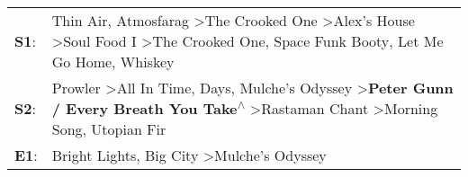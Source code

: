 \begin{supertabular}{p{0.03\textwidth}p{0.92\textwidth}}
 \textbf{S1}:  &                     Thin Air\textsuperscript{}, \enspace Atmosfarag\textsuperscript{} \textgreater \enspace The Crooked One\textsuperscript{} \textgreater \enspace Alex's House\textsuperscript{} \textgreater \enspace Soul Food I\textsuperscript{} \textgreater \enspace The Crooked One\textsuperscript{}, \enspace Space Funk Booty\textsuperscript{}, \enspace Let Me Go Home, Whiskey\textsuperscript{}  \enspace  \\
 \textbf{S2}:  &  Prowler\textsuperscript{} \textgreater \enspace All In Time\textsuperscript{},  Days\textsuperscript{}, \enspace Mulche's Odyssey\textsuperscript{} \textgreater \enspace \textbf{Peter Gunn / Every Breath You Take\textsuperscript{$\wedge$}} \textgreater \enspace Rastaman Chant\textsuperscript{} \textgreater \enspace Morning Song\textsuperscript{}, \enspace Utopian Fir\textsuperscript{}  \enspace  \\
 \textbf{E1}:  &                                                                                                                                                                                                                                                                                                              Bright Lights, Big City\textsuperscript{} \textgreater \enspace Mulche's Odyssey\textsuperscript{}  \enspace  \\
\end{supertabular}
